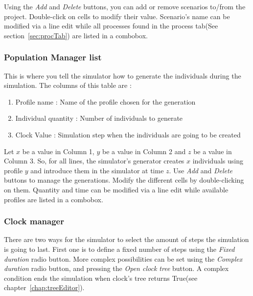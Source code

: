 \documentclass[a4paper,11pt]{report}
\begin{document}
Using the \emph{Add} and \emph{Delete} buttons, you can add or remove scenarios to/from the project. Double-click on cells to modify their value. Scenario's name can be modified via a line edit while all processes found in the process tab(See section~\ref{sec:procTab}) are listed in a combobox.

\subsubsection{Population Manager list}
This is where you tell the simulator how to generate the individuals during the simulation. The columns of this table are :
\begin{enumerate}
\item{Profile name : } Name of the profile chosen for the generation
\item{Individual quantity : } Number of individuals to generate
\item{Clock Value : } Simulation step when the individuals are going to be created 
\end{enumerate}
Let \begin{math}x\end{math} be a value in Column 1, \begin{math}y\end{math} be a value in Column 2 and \begin{math}z\end{math} be a value in Column 3. So, for all lines, the simulator's generator creates \begin{math}x\end{math} individuals using profile \begin{math}y\end{math} and introduce them in the simulator at time \begin{math}z\end{math}. Use \emph{Add} and \emph{Delete} buttons to manage the generations. Modify the different cells by double-clicking on them. Quantity and time can be modified via a line edit while available profiles are listed in a combobox.

\subsubsection{Clock manager}
\label{subsubsec:clockMan}
There are two ways for the simulator to select the amount of steps the simulation is going to last. First one is to define a fixed number of steps using the \emph{Fixed duration} radio button. More complex possibilities can be set using the \emph{Complex duration} radio button, and pressing the \emph{Open clock tree} button. A complex condition ends the simulation when clock's tree returns True(see chapter~\ref{chap:treeEditor}).
\end{document}
